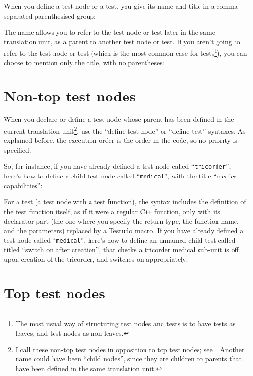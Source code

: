 \documentclass[twoside, a4paper, article]{memoir}
\providecommand\typesetexample[1]{%
}
\newcommand*\Cpp{C\texttt{++}}
\begin{document}
When you define a test node or a test, you give its name and title in a
comma-separated parenthesised group:

\typesetexample{define-test-node}

The name allows you to refer to the test node or test later in the same
translation unit, as a parent to another test node or test.  If you aren't
going to refer to the test node or test (which is the most common case for
tests\footnote{The most usual way of structuring test nodes and tests is to
  have tests as leaves, and test nodes as non-leaves.}), you can choose to
mention only the title, with no parentheses:

\typesetexample{define-test-ellipses}

\section{Non-top test nodes}
\label{sec:non-top-test-nodes}

When you declare or define a test node whose parent has been defined in the
current translation unit\footnote{I call these non-top test nodes in opposition
  to top test nodes; see~.  Another name could have
  been ``child nodes'', since they are children to parents that have been
  defined in the same translation unit.}, use the ``define-test-node'' or
``define-test'' syntaxes.  As explained before, the execution order is the
order in the code, so no priority is specified.

So, for instance, if you have already defined a test node called
``\texttt{tricorder}'', here's how to define a child test node called
``\texttt{medical}'', with the title ``medical capabilities'':

\typesetexample{define-test-node}

For a test (a test node with a test function), the syntax includes the
definition of the test function itself, as if it were a regular \Cpp{}
function, only with its declarator part (the one where you specify the return
type, the function name, and the parameters) replaced by a Testudo macro.  If
you have already defined a test node called ``\texttt{medical}'', here's how to
define an unnamed child test called titled ``switch on after creation'', that
checks a tricorder medical sub-unit is off upon creation of the tricorder, and
switches on appropriately:

\typesetexample{define-test-full}

\section{Top test nodes}
\label{sec:top-test-nodes}
\end{document}
